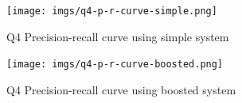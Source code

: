 \documentclass[sigconf]{acmart}
\begin{document}
\begin{figure}[H]
  \centering
  \texttt{[image: imgs/q4-p-r-curve-simple.png]}
  \caption{Q4 Precision-recall curve using simple system}
  \label{fig:q4_simple}
\end{figure}

\begin{figure}[H]
  \centering
  \texttt{[image: imgs/q4-p-r-curve-boosted.png]}
  \caption{Q4 Precision-recall curve using boosted system}
  \label{fig:q4_boosted}
\end{figure}
\end{document}
